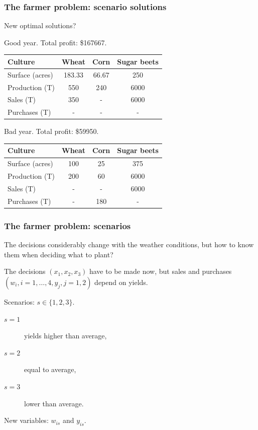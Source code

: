 \documentclass{beamer}
\def\blue{\color{blue}}
\def\red{\color{red}}
\begin{document}
\begin{frame}
\frametitle{The farmer problem: scenario solutions}

{\blue New optimal solutions?}

\mbox{}

{\red Good year}. Total profit: \$167667.
\begin{center}
\begin{tabular}{lccc}
\hline
Culture & Wheat & Corn & Sugar beets \\
\hline
Surface (acres) & 183.33 & 66.67 & 250 \\
Production (T) & 550 & 240 & 6000 \\
Sales (T) & 350 & - & 6000 \\
Purchases (T) & - & - & - \\
\hline
\end{tabular}
\end{center}

\mbox{}

\mbox{}

{\red Bad year}. Total profit: \$59950.
\begin{center}
\begin{tabular}{lccc}
\hline
Culture & Wheat & Corn & Sugar beets \\
\hline
Surface (acres) & 100 & 25 & 375 \\
Production (T) & 200 & 60 & 6000 \\
Sales (T) & - & - & 6000 \\
Purchases (T) & - & 180 & - \\
\hline
\end{tabular}
\end{center}

\end{frame}

\begin{frame}
\frametitle{The farmer problem: scenarios}

The decisions considerably change with the weather conditions, but how to know them when deciding what to plant?
\mbox{}

The decisions $(x_1, x_2, x_3)$ have to be made now, but sales and purchases $(w_i, i=1,\ldots,4, y_j, j=1,2)$ depend on yields.

\mbox{}

{\blue Scenarios}: $s \in \{1,2,3\}$.
\begin{description}
	\item[$s = 1$] yields higher than average,
	\item[$s = 2$] equal to average,
	\item[$s = 3$] lower than average.
\end{description}
New variables: $w_{is}$ and $y_{is}$.

\end{frame}
\end{document}
